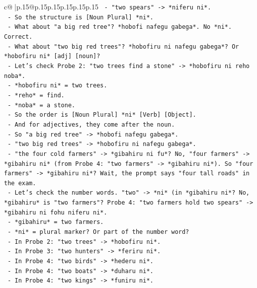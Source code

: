 \documentclass{article}
\begin{document}
{\begin{supertabular}{c@{$\;$}|p{.15\linewidth}@{}p{.15\linewidth}p{.15\linewidth}p{.15\linewidth}p{.15\linewidth}p{.15\linewidth}}
{{{\texttt{        {-} "two spears" {-}> *niferu ni*.} \\
\texttt{        {-} So the structure is {[}Noun Plural{]} *ni*.} \\
\texttt{        {-} What about "a big red tree"? *hobofi nafegu gabega*. No *ni*. Correct.} \\
\texttt{        {-} What about "two big red trees"? *hobofiru ni nafegu gabega*? Or *hobofiru ni* {[}adj{]} {[}noun{]}?} \\
\texttt{        {-} Let's check Probe 2: "two trees find a stone" {-}> *hobofiru ni reho noba*.} \\
\texttt{          {-} *hobofiru ni* = two trees.} \\
\texttt{          {-} *reho* = find.} \\
\texttt{          {-} *noba* = a stone.} \\
\texttt{        {-} So the order is {[}Noun Plural{]} *ni* {[}Verb{]} {[}Object{]}.} \\
\texttt{        {-} And for adjectives, they come after the noun.} \\
\texttt{        {-} So "a big red tree" {-}> *hobofi nafegu gabega*.} \\
\texttt{        {-} "two big red trees" {-}> *hobofiru ni nafegu gabega*.} \\
\texttt{        {-} "the four cold farmers" {-}> *gibahiru ni fu*? No, "four farmers" {-}> *gibahiru ni* (from Probe 4: "two farmers" {-}> *gibahiru ni*). So "four farmers" {-}> *gibahiru ni*? Wait, the prompt says "four tall roads" in the exam.} \\
\texttt{        {-} Let's check the number words. "two" {-}> *ni* (in *gibahiru ni*? No, *gibahiru* is "two farmers"? Probe 4: "two farmers hold two spears" {-}> *gibahiru ni fohu niferu ni*.} \\
\texttt{          {-} *gibahiru* = two farmers.} \\
\texttt{          {-} *ni* = plural marker? Or part of the number word?} \\
\texttt{          {-} In Probe 2: "two trees" {-}> *hobofiru ni*.} \\
\texttt{          {-} In Probe 3: "two hunters" {-}> *feriru ni*.} \\
\texttt{          {-} In Probe 4: "two birds" {-}> *hederu ni*.} \\
\texttt{          {-} In Probe 4: "two boats" {-}> *duharu ni*.} \\
\texttt{          {-} In Probe 4: "two kings" {-}> *funiru ni*.} \\
}}}
\end{supertabular}}
\end{document}
